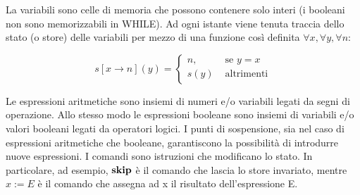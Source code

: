 La variabili sono celle di memoria che possono contenere solo interi
(i booleani non sono memorizzabili in WHILE).
Ad ogni istante
viene tenuta traccia dello stato (o store) delle variabili per mezzo di una
funzione così definita
$ \forall x, \forall y, \forall n$:

$$ s[x \rightarrow n](y) =
	\begin{cases} n, & \mbox{ se } y=x \\
				  s(y) & \mbox{ altrimenti}
	\end{cases}
$$

Le espressioni aritmetiche sono insiemi di numeri e/o variabili legati da segni di operazione.
Allo stesso modo le espressioni booleane sono insiemi di variabili e/o valori booleani legati da
operatori logici.
I punti di sospensione, sia nel caso di espressioni aritmetiche che booleane,
garantiscono la possibilità di introdurre nuove espressioni.
I comandi sono istruzioni che modificano lo stato. In particolare, ad esempio,
$\mathop{\textup{\textbf{skip}}}$ è il comando che lascia lo store invariato, mentre $x:=E$ è il comando che 
assegna ad x il risultato dell'espressione E.
